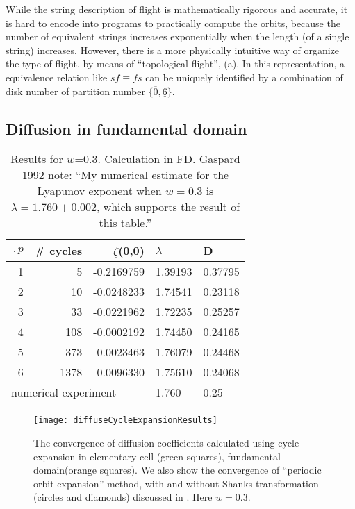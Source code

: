 \documentclass[aps,pre,
                showpacs,
                twocolumn,
                groupedaddress,
                floatfix]{revtex4-1}
\begin{document}
While the string description of flight is mathematically rigorous and accurate, it is hard to encode into programs to practically compute the orbits, because the number of equivalent strings increases exponentially when the length (of a single string) increases. However, there is a more physically intuitive way of organize the type of flight, by means of ``topological flight'',  (a). In this representation, a equivalence relation like $sf\equiv fs$ can be uniquely identified by a combination of disk number of partition number $\{\overline{0},\underline{6}\}$. 

\subsection{Diffusion in fundamental domain}
\begin{table}[htbp]
\hfill
{}
\begin{tabular}{|r|r|r|l|l|}
\hline
$\period{p}$ & \# cycles & $\zeta$(0,0) & $\lambda$ & D \\ \hline\hline
1      & 5      & -0.2169759 & 1.39193 & 0.37795 \\
2      & 10     & -0.0248233 & 1.74541 & 0.23118\\
3      & 33     & -0.0221962 & 1.72235 & 0.25257\\
4      & 108    & -0.0002192 & 1.74450 & 0.24165\\
5      & 373    &  0.0023463 & 1.76079 & 0.24468\\
6      & 1378   &  0.0096330 & 1.75610 & 0.24068\\ \hline\hline
\multicolumn{3}{|l|}{numerical experiment}
                           & 1.760 & 0.25
\\ \hline
\end{tabular}

\caption{\label{TCELL2}
  Results for $w$=0.3. Calculation in FD. Gaspard 1992
  note: ``My numerical estimate for the Lyapunov exponent when $w=0.3$ is
  $\lambda = 1.760 \pm 0.002$, which supports the result of this table.''
}
\end{table}

\begin{figure}[htbp]
  \texttt{[image: diffuseCycleExpansionResults]}
  \caption[]{\label{fig-results} The convergence of diffusion coefficients  calculated using cycle expansion in elementary cell (green squares),  fundamental domain(orange squares). We  also show the convergence of ``periodic orbit expansion'' method, with and  without Shanks transformation (circles and diamonds) discussed in  . Here $w = 0.3$.  }
\end{figure}
\end{document}
